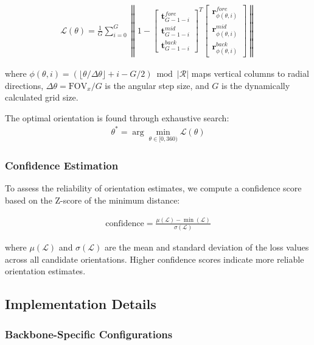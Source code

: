 \documentclass{bmvc2k}
\begin{document}
\begin{align}
\mathcal{L}(\theta) = \frac{1}{G} \sum_{i=0}^{G} \left\| 1 - \begin{bmatrix} \mathbf{t}_{G-1-i}^{fore} \\ \mathbf{t}_{G-1-i}^{mid} \\ \mathbf{t}_{G-1-i}^{back} \end{bmatrix}^T \begin{bmatrix} \mathbf{r}_{\phi(\theta,i)}^{fore} \\ \mathbf{r}_{\phi(\theta,i)}^{mid} \\ \mathbf{r}_{\phi(\theta,i)}^{back} \end{bmatrix} \right\|
\end{align}

where $\phi(\theta,i) = (\lfloor\theta/\Delta\theta\rfloor + i - G/2) \bmod |\mathcal{R}|$ maps vertical columns to radial directions, $\Delta\theta = \text{FOV}_x / G$ is the angular step size, and $G$ is the dynamically calculated grid size.

The optimal orientation is found through exhaustive search:
\begin{align}
\theta^* = \arg\min_{\theta \in [0, 360)} \mathcal{L}(\theta)
\end{align}

\subsubsection{Confidence Estimation}

To assess the reliability of orientation estimates, we compute a confidence score based on the Z-score of the minimum distance:

\begin{align}
\text{confidence} = \frac{\mu(\mathcal{L}) - \min(\mathcal{L})}{\sigma(\mathcal{L})}
\end{align}

where $\mu(\mathcal{L})$ and $\sigma(\mathcal{L})$ are the mean and standard deviation of the loss values across all candidate orientations. Higher confidence scores indicate more reliable orientation estimates.

\subsection{Implementation Details}

\subsubsection{Backbone-Specific Configurations}
\end{document}
